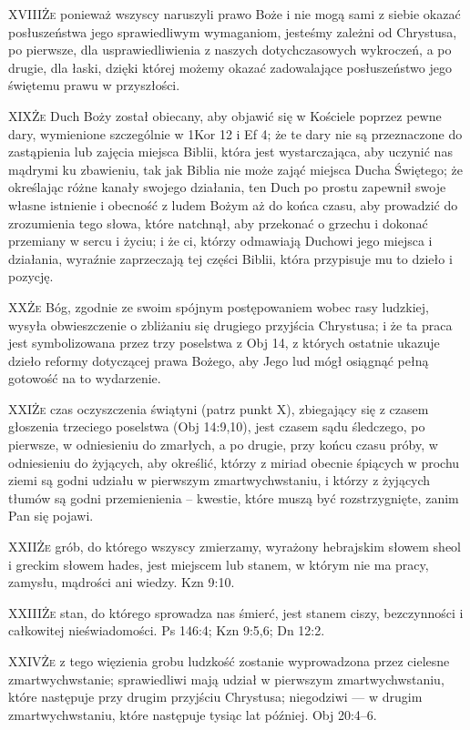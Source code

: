 \lettrine{XVIII}{Że} ponieważ wszyscy naruszyli prawo Boże i nie mogą sami z siebie okazać posłuszeństwa jego sprawiedliwym wymaganiom, jesteśmy zależni od Chrystusa, po pierwsze, dla usprawiedliwienia z naszych dotychczasowych wykroczeń, a po drugie, dla łaski, dzięki której możemy okazać zadowalające posłuszeństwo jego świętemu prawu w przyszłości.

\lettrine{XIX}{Że} Duch Boży został obiecany, aby objawić się w Kościele poprzez pewne dary, wymienione szczególnie w 1Kor 12 i Ef 4; że te dary nie są przeznaczone do zastąpienia lub zajęcia miejsca Biblii, która jest wystarczająca, aby uczynić nas mądrymi ku zbawieniu, tak jak Biblia nie może zająć miejsca Ducha Świętego; że określając różne kanały swojego działania, ten Duch po prostu zapewnił swoje własne istnienie i obecność z ludem Bożym aż do końca czasu, aby prowadzić do zrozumienia tego słowa, które natchnął, aby przekonać o grzechu i dokonać przemiany w sercu i życiu; i że ci, którzy odmawiają Duchowi jego miejsca i działania, wyraźnie zaprzeczają tej części Biblii, która przypisuje mu to dzieło i pozycję.

\lettrine{XX}{Że} Bóg, zgodnie ze swoim spójnym postępowaniem wobec rasy ludzkiej, wysyła obwieszczenie o zbliżaniu się drugiego przyjścia Chrystusa; i że ta praca jest symbolizowana przez trzy poselstwa z Obj 14, z których ostatnie ukazuje dzieło reformy dotyczącej prawa Bożego, aby Jego lud mógł osiągnąć pełną gotowość na to wydarzenie.

\lettrine{XXI}{Że} czas oczyszczenia świątyni (patrz punkt X), zbiegający się z czasem głoszenia trzeciego poselstwa (Obj 14:9,10), jest czasem sądu śledczego, po pierwsze, w odniesieniu do zmarłych, a po drugie, przy końcu czasu próby, w odniesieniu do żyjących, aby określić, którzy z miriad obecnie śpiących w prochu ziemi są godni udziału w pierwszym zmartwychwstaniu, i którzy z żyjących tłumów są godni przemienienia – kwestie, które muszą być rozstrzygnięte, zanim Pan się pojawi.

\lettrine{XXII}{Że} grób, do którego wszyscy zmierzamy, wyrażony hebrajskim słowem sheol i greckim słowem hades, jest miejscem lub stanem, w którym nie ma pracy, zamysłu, mądrości ani wiedzy. Kzn 9:10.

\lettrine{XXIII}{Że} stan, do którego sprowadza nas śmierć, jest stanem ciszy, bezczynności i całkowitej nieświadomości. Ps 146:4; Kzn 9:5,6; Dn 12:2.

\lettrine{XXIV}{Że} z tego więzienia grobu ludzkość zostanie wyprowadzona przez cielesne zmartwychwstanie; sprawiedliwi mają udział w pierwszym zmartwychwstaniu, które następuje przy drugim przyjściu Chrystusa; niegodziwi — w drugim zmartwychwstaniu, które następuje tysiąc lat później. Obj 20:4--6.

